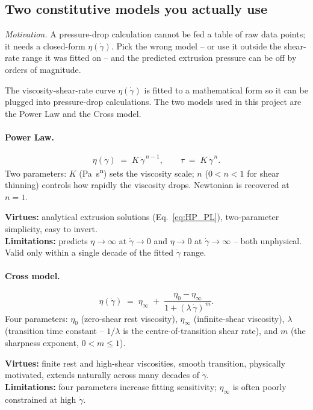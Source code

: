 \documentclass[11pt,a4paper]{article}
\newcommand{\gd}{\dot{\gamma}}
\begin{document}
\subsection{Two constitutive models you actually use}
\label{sec:models}

\emph{Motivation.} A pressure-drop calculation cannot be fed a table of raw
data points; it needs a closed-form $\eta(\gd)$. Pick the wrong model -- or
use it outside the shear-rate range it was fitted on -- and the predicted
extrusion pressure can be off by orders of magnitude.

The viscosity-shear-rate curve $\eta(\gd)$ is fitted to a
mathematical form so it can be plugged into pressure-drop calculations.
The two models used in this project are the Power Law and the Cross model.

\paragraph{Power Law.}
\begin{equation}
\eta(\gd) \;=\; K\,\gd^{\,n-1}, \qquad
\tau \;=\; K\,\gd^{\,n}.
\label{eq:powerlaw}
\end{equation}
Two parameters: $K$ (\si{\Pa\s^n}) sets the viscosity scale; $n$
($0<n<1$ for shear thinning) controls how rapidly the viscosity drops.
Newtonian is recovered at $n=1$.

\textbf{Virtues:} analytical extrusion solutions (Eq.~\ref{eq:HP_PL}),
two-parameter simplicity, easy to invert.\\
\textbf{Limitations:} predicts $\eta\to\infty$ at $\gd\to 0$ and
$\eta\to 0$ at $\gd\to\infty$ -- both unphysical. Valid only within a
single decade of the fitted $\gd$ range.

\paragraph{Cross model.}
\begin{equation}
\eta(\gd) \;=\; \eta_\infty
\;+\;\frac{\eta_0 - \eta_\infty}{1+(\lambda\,\gd)^{\,m}}.
\label{eq:cross}
\end{equation}
Four parameters: $\eta_0$ (zero-shear rest viscosity), $\eta_\infty$
(infinite-shear viscosity), $\lambda$ (transition time constant --
$1/\lambda$ is the centre-of-transition shear rate), and $m$ (the
sharpness exponent, $0<m\leq 1$).

\textbf{Virtues:} finite rest and high-shear viscosities, smooth
transition, physically motivated, extends naturally across many decades
of $\gd$.\\
\textbf{Limitations:} four parameters increase fitting sensitivity;
$\eta_\infty$ is often poorly constrained at high $\gd$.
\end{document}
